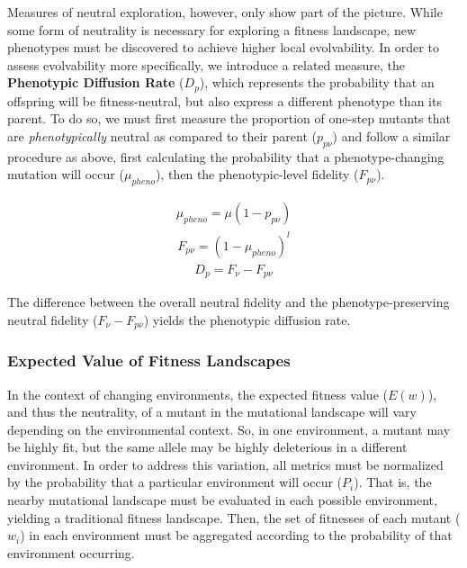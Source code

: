 \documentclass[10pt,letterpaper]{article}
\begin{document}
Measures of neutral exploration, however, only show part of the picture. While some form of neutrality is necessary for exploring a fitness landscape, new phenotypes must be discovered to achieve higher local evolvability. In order to assess evolvability more specifically, we introduce a related measure, the \textbf{Phenotypic Diffusion Rate} ($D_p$), which represents the probability that an offspring will be fitness-neutral, but also express a different phenotype than its parent. To do so, we must first measure the proportion of one-step mutants that are \textit{phenotypically} neutral as compared to their parent ($p_{p\nu}$) and follow a similar procedure as above, first calculating the probability that a phenotype-changing mutation will occur ($\mu_{pheno}$), then the phenotypic-level fidelity ($F_{p\nu}$).

	\begin{eqnarray}
	\label{eq:phenotypic_mutation_rate}
		\mu_{pheno} = \mu (1- p_{p\nu})
	\end{eqnarray}
	\begin{eqnarray}
	\label{eq:phenotypic_fidelity}
		F_{p\nu} = (1 - \mu_{pheno})^l
	\end{eqnarray}
	\begin{eqnarray}
	\label{eq:phenotypic_diffusion_rate}
		D_p = F_\nu - F_{p\nu}
	\end{eqnarray}

The difference between the overall neutral fidelity and the phenotype-preserving neutral fidelity ($F_\nu - F_{p\nu}$) yields the phenotypic diffusion rate.

\subsubsection*{Expected Value of Fitness Landscapes}
In the context of changing environments, the expected fitness value ($E(w)$), and thus the neutrality, of a mutant in the mutational landscape will vary depending on the environmental context. So, in one environment, a mutant may be highly fit, but the same allele may be highly deleterious in a different environment. In order to address this variation, all metrics must be normalized by the probability that a particular environment will occur ($P_i$). That is, the nearby mutational landscape must be evaluated in each possible environment, yielding a traditional fitness landscape. Then, the set of fitnesses of each mutant ($w_i$) in each environment must be aggregated according to the probability of that environment occurring.
\end{document}
